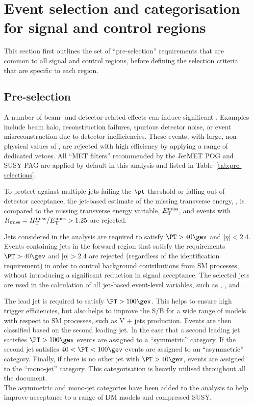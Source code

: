 \section{Event selection and categorisation for signal and control regions}
\label{sec:selection}

This section first outlines the set of ``pre-selection'' requirements
that are common to all signal and control regions, before defining the
selection criteria that are specific to each region.

\subsection{Pre-selection}
\label{sec:preSelection}

A number of beam- and detector-related effects can induce significant
\met. Examples include beam halo, reconstruction failures, spurious
detector noise, or event misreconstruction due to detector
inefficiencies. These events, with large, non-physical values of \met,
are rejected with high efficiency by applying a range of dedicated
vetoes. All ``MET filters'' recommended by the JetMET POG and SUSY PAG
are applied by default in this analysis and listed in Table~\ref{tab:pre-selections}.

To protect against multiple jets failing the $\pt$ threshold or
falling out of detector acceptance, the jet-based
estimate of the missing transverse energy, \mht, is compared to the
missing transverse energy variable, $\mbox{$E_\text{T}^{\rm miss}$}$, and events with 
$R_{\mathrm{miss}}=\mbox{$H_{\rm T}^{\rm miss}$}/\mbox{$E_\text{T}^{\rm miss}$} > 1.25$ are rejected.

Jets considered in the analysis are required to satisfy $\PT>40\gev$
and $|\eta|<2.4$. Events containing jets in the forward region that
satisfy the requirements $\PT>40\gev$ and $|\eta|>2.4$ are rejected (regardless of the identification requirement) 
in order to control background contributions from SM processes, without
introducing a significant reduction in signal acceptance. The selected jets 
are used in the calculation of all jet-based
event-level variables, such as \HT, \mht, and \alphat.

The lead jet is required to satisfy $\PT > 100\gev$. 
This helps to ensure high trigger efficiencies,
but also helps to improve the S/B for a wide
range of models with respect to SM processes, such as V + jets
production. Events are then classified based on the
second leading jet. In the case that a second leading jet satisfies $\PT > 100\gev$ 
events are assigned to a ``symmetric'' \njet category. If the second
jet satisfies $40 < \PT < 100\gev$ events are assigned to an
``asymmetric'' \njet category. Finally, if there is no other jet 
with $\PT>40\gev$, events are assigned to the ``mono-jet''
category. This categorisation is heavily utilised throughout all the document. \\
The asymmetric and mono-jet categories have been added to
the analysis to help improve acceptance to a range of DM models and compressed
SUSY.

